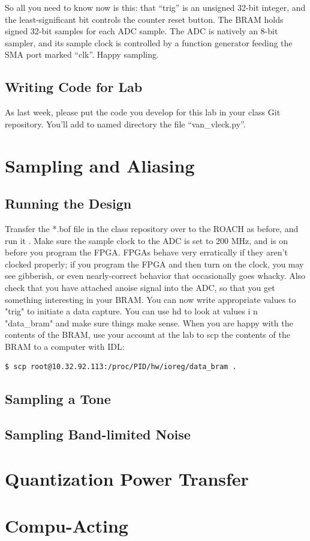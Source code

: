 \documentclass[11pt]{article}
\begin{document}
So all you need to know now is this: that ``trig'' is an unsigned 32-bit integer, and the least-significant bit
controls the counter reset button.  The BRAM holds signed 32-bit samples for each ADC sample.  The
ADC is natively an 8-bit sampler, and its sample clock is controlled by a function generator feeding the
SMA port marked ``clk''.  Happy sampling.

\subsection*{Writing Code for Lab}

As last week, please put the code you develop for this lab
in your class Git repository.  You'll add to named directory the file ``van\_vleck.py''.

\section{Sampling and Aliasing}

\subsection{Running the Design}

Transfer the *.bof file in the class repository over to the ROACH as before, and run it
.  Make sure the sample clock
to the ADC is set to 200 MHz, and is on before you program the FPGA.  FPGAs behave very erratically if they aren't
clocked properly; if you program the FPGA and then turn on the clock, you may see gibberish, or even nearly-correct
behavior that occasionally goes whacky.  Also check that you have attached anoise signal into the ADC, so that you get something interesting in your BRAM.  
You can now write appropriate
values to "trig" to initiate a data capture.  You can use hd to look at values i
n "data\_bram" and make sure things
make sense.  When you are happy with the contents of the BRAM, use your account 
at the lab to scp the contents of the
BRAM to a computer with IDL:\begin{verbatim}
$ scp root@10.32.92.113:/proc/PID/hw/ioreg/data_bram .\end{verbatim}


\subsection{Sampling a Tone}

\subsection{Sampling Band-limited Noise}

\section{Quantization Power Transfer}

\section{Compu-Acting}
\end{document}
